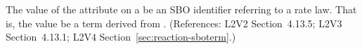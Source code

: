 The value of the  attribute on a \KineticLaw {} be an SBO
identifier referring to a rate law.  That is, the value  be a term
derived from \sboratelaw.  (References: L2V2 Section~4.13.5; L2V3
Section~4.13.1; L2V4 Section~\ref{sec:reaction-sboterm}.)
